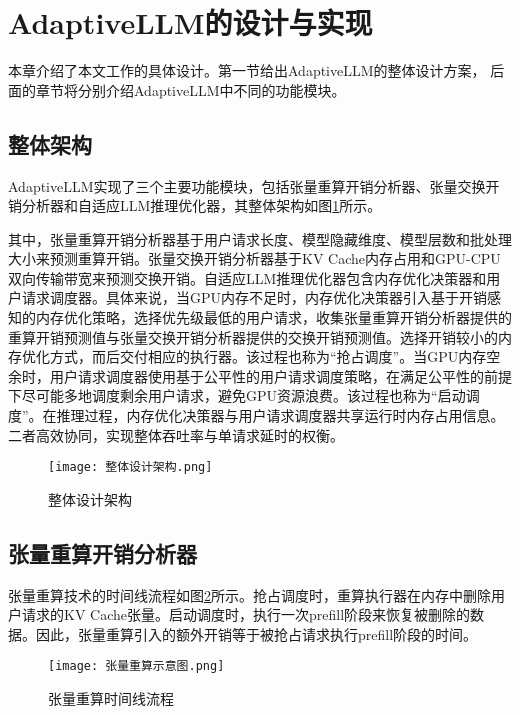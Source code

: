 \section{AdaptiveLLM的设计与实现}

本章介绍了本文工作的具体设计。第一节给出AdaptiveLLM的整体设计方案， 后面的章节将分别介绍AdaptiveLLM中不同的功能模块。

\subsection{整体架构}

AdaptiveLLM实现了三个主要功能模块，包括张量重算开销分析器、张量交换开销分析器和自适应LLM推理优化器，其整体架构如图\ref{Fig:整体设计架构}所示。

其中，张量重算开销分析器基于用户请求长度、模型隐藏维度、模型层数和批处理大小来预测重算开销。张量交换开销分析器基于KV Cache内存占用和GPU-CPU双向传输带宽来预测交换开销。自适应LLM推理优化器包含内存优化决策器和用户请求调度器。具体来说，当GPU内存不足时，内存优化决策器引入基于开销感知的内存优化策略，选择优先级最低的用户请求，收集张量重算开销分析器提供的重算开销预测值与张量交换开销分析器提供的交换开销预测值。选择开销较小的内存优化方式，而后交付相应的执行器。该过程也称为“抢占调度”。当GPU内存空余时，用户请求调度器使用基于公平性的用户请求调度策略，在满足公平性的前提下尽可能多地调度剩余用户请求，避免GPU资源浪费。该过程也称为“启动调度”。在推理过程，内存优化决策器与用户请求调度器共享运行时内存占用信息。二者高效协同，实现整体吞吐率与单请求延时的权衡。

\begin{figure}[!htbp]
  \centering
  \texttt{[image: 整体设计架构.png]}
  \caption{整体设计架构}
  \label{Fig:整体设计架构}
\end{figure}

\subsection{张量重算开销分析器}

张量重算技术的时间线流程如图\ref{Fig:张量重算示意图}所示。抢占调度时，重算执行器在内存中删除用户请求的KV Cache张量。启动调度时，执行一次prefill阶段来恢复被删除的数据。因此，张量重算引入的额外开销等于被抢占请求执行prefill阶段的时间。

\begin{figure}[!htbp]
  \centering
  \texttt{[image: 张量重算示意图.png]}
  \caption{张量重算时间线流程}
  \label{Fig:张量重算示意图}
\end{figure}

